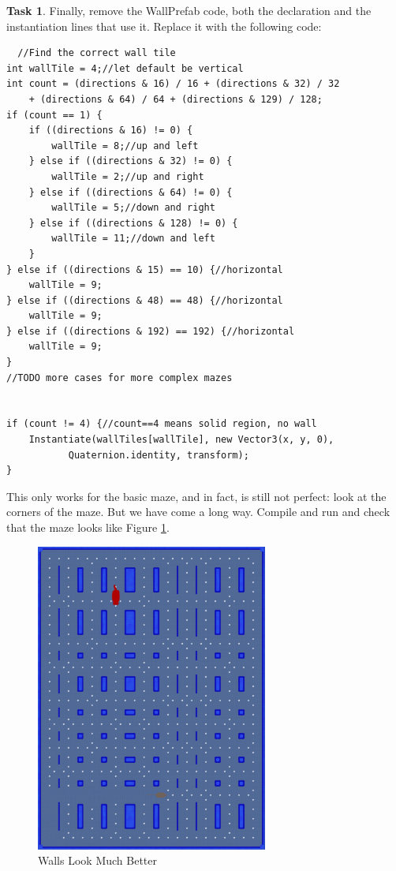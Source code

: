 \documentclass[12pt]{amsbook}
\theoremstyle{definition}
\newtheorem{task}[exercise]{Task}
\theoremstyle{remark}
\numberwithin{figure}{chapter}
\numberwithin{table}{chapter}
\numberwithin{section}{chapter}
\numberwithin{equation}{section}
\begin{document}
\begin{task}
Finally, remove the WallPrefab code, both the declaration and the instantiation lines that use it.  Replace it with the following code:
\begin{verbatim}
  //Find the correct wall tile
int wallTile = 4;//let default be vertical
int count = (directions & 16) / 16 + (directions & 32) / 32
    + (directions & 64) / 64 + (directions & 129) / 128;
if (count == 1) {
    if ((directions & 16) != 0) {
        wallTile = 8;//up and left
    } else if ((directions & 32) != 0) {
        wallTile = 2;//up and right
    } else if ((directions & 64) != 0) {
        wallTile = 5;//down and right
    } else if ((directions & 128) != 0) {
        wallTile = 11;//down and left
    }
} else if ((directions & 15) == 10) {//horizontal
    wallTile = 9;
} else if ((directions & 48) == 48) {//horizontal
    wallTile = 9;
} else if ((directions & 192) == 192) {//horizontal
    wallTile = 9;
}
//TODO more cases for more complex mazes


if (count != 4) {//count==4 means solid region, no wall
    Instantiate(wallTiles[wallTile], new Vector3(x, y, 0),
           Quaternion.identity, transform);
}
\end{verbatim}
\end{task}

This only works for the basic maze, and in fact, is still not perfect: look at the corners of the maze.  But we have come a long way.  Compile and run and check that the maze looks like Figure \ref{fig:better-walls}.

\begin{figure}[h]
  \includegraphics[width=3in]{BetterWalls.png}
  \caption{Walls Look Much Better}
  \label{fig:better-walls}
\end{figure}
\end{document}
